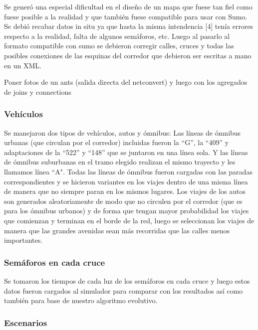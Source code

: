 Se generó una especial dificultad en el diseño de un mapa que
fuese tan fiel como fuese posible a la realidad y que también
fuese compatible para usar con  Sumo. Se debió recabar datos
in  situ  ya  que  hasta  la  misma  intendencia  [4]  tenía  errores
respecto a la realidad, falta de algunos semáforos, etc. Luego al
pasarlo  al  formato  compatible  con  sumo  se  debieron  corregir
calles,  cruces  y  todas las  posibles  conexiones de  las  esquinas
del corredor que debieron ser escritas a mano en un XML.

Poner fotos de un ants (salida directa del netconvert) y luego con los agregados de joins y connections


\subsubsection{Vehículos}
Se manejaron dos tipos de vehículos, autos y ómnibus:
Las  líneas  de  ómnibus  urbanas  (que  circulan  por  el
corredor)  incluidas  fueron  la  “G”,  la  “409”  y
adaptaciones  de  la  “522”  y  “148”  que  se  juntaron  en
una  línea  sola. Y  las líneas de ómnibus suburbanas en
el  tramo  elegido  realizan  el  mismo  trayecto  y  les
llamamos  línea  “A".  Todas  las  líneas  de  ómnibus
fueron cargadas con las paradas correspondientes y se
hicieron  variantes  en  los  viajes  dentro  de  una  misma
línea de manera que no siempre paran en los mismos
lugares.
Los  viajes  de  los  autos  son  generados  aleatoriamente
de modo que no circulen por el corredor (que es para
los  ómnibus  urbanos)  y  de  forma  que  tengan  mayor
probabilidad los viajes que comienzan y terminan en el
borde  de  la  red,  luego  se  seleccionan  los  viajes  de
manera  que  las  grandes  avenidas  sean  más  recorridas
que  las  calles  menos  importantes.

\subsubsection{Semáforos en cada cruce}
Se  tomaron  los  tiempos  de  cada  luz  de  los  semáforos  en
cada  cruce  y  luego  estos  datos  fueron  cargados  al  simulador
para comparar con los  resultados  así como también para base
de nuestro algoritmo evolutivo.

\subsubsection{Escenarios}



